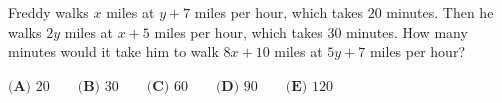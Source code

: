 Freddy walks $x$ miles at $y+7$ miles per hour, which takes $20$ minutes. Then he walks $2y$ miles at $x+5$ miles per hour, which takes $30$ minutes. How many minutes would it take him to walk $8x+10$ miles at $5y+7$ miles per hour?

$\textbf{(A) }20\qquad\textbf{(B) }30\qquad\textbf{(C) }60\qquad\textbf{(D) }90\qquad\textbf{(E) }120$

